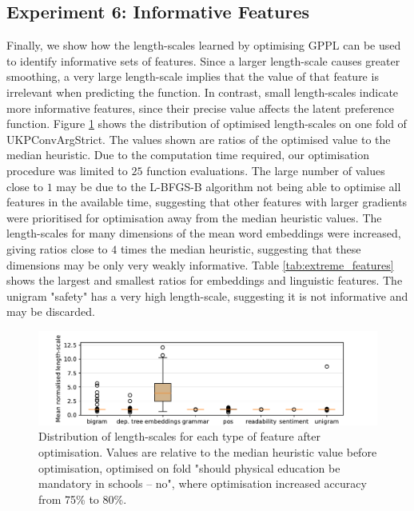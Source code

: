 
\subsection{Experiment 6: Informative Features}

Finally, we show how the length-scales learned by optimising GPPL can be used to identify
informative sets of features. Since a larger length-scale causes greater smoothing, 
a very large length-scale implies that the value of that feature is irrelevant when predicting 
the function. In contrast, small length-scales indicate more informative features, since their
precise value affects the latent preference function.
Figure \ref{fig:boxplot} shows the distribution of optimised length-scales on one fold of UKPConvArgStrict. 
The values shown are ratios of the optimised value to the median heuristic. 
Due to the computation time required, our optimisation procedure was limited to $25$ function evaluations. 
The large number of values close to $1$ may be due to the L-BFGS-B
algorithm not being able to optimise all features in the available time, 
suggesting that other features with larger gradients were prioritised for optimisation
away from the median heuristic values. 
The length-scales for many dimensions of the mean word embeddings were increased,
giving ratios close to $4$ times the median heuristic, suggesting that these dimensions may be
only very weakly informative. Table \ref{tab:extreme_features} shows the largest
and smallest ratios for embeddings and linguistic features. The unigram "safety" has
a very high length-scale, suggesting it is not informative and may be discarded. 
\begin{figure}
\includegraphics[width=\columnwidth, clip=True, trim=32 0 57 0]{figures/features/boxplot}
\caption{Distribution of length-scales for each type of feature after optimisation. 
Values are relative to the median heuristic value before optimisation, optimised 
on fold "should physical education be mandatory in schools -- no", where 
optimisation increased accuracy from 75\% to 80\%. }
\label{fig:boxplot}
\end{figure}
